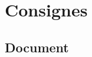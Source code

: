 \documentclass[journal, a4paper]{IEEEtran}
\begin{document}



\newpage

\appendices
\section{Consignes}
\subsection*{Document}



\end{document}
